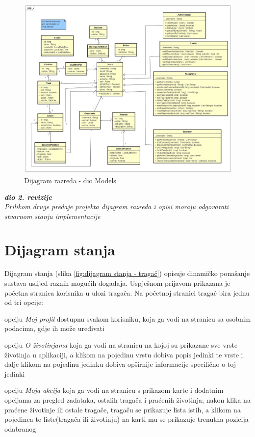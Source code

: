 			\eject

			\begin{figure}[H]
				\includegraphics[scale=0.4]{slike/klasni_dijagram_models.jpg}
				\centering
				\caption{Dijagram razreda - dio Models}
				\label{fig:models}
			\end{figure}
			

			\textbf{\textit{dio 2. revizije}}\\			
			
			\textit{Prilikom druge predaje projekta dijagram razreda i opisi moraju odgovarati stvarnom stanju implementacije}
			
			
			
			\eject
		
		\section{Dijagram stanja}
			
			Dijagram stanja (slika \ref{fig:dijagram stanja - tragač}) opisuje dinamičko ponašanje sustava uslijed raznih mogućih
		događaja. Uspješnom prijavom prikazana je početna stranica korisnika u ulozi tragača. 
		Na početnoj stranici tragač bira jednu od tri opcije:
		\begin{packed_item}
		\item opciju \textit{Moj profil} dostupnu svakom korisniku, koja ga vodi na stranicu sa osobnim podacima, gdje ih može uređivati
		\item opciju \textit{O životinjama} koja ga vodi na stranicu na kojoj su prikazane sve vrste životinja u aplikaciji, a klikom na pojedinu vrstu dobiva popis jedinki te vrste i dalje klikom na pojedinu jedinku dobiva opširnije informacije specifično o toj jedinki
		\item opciju \textit{Moja akcija} koja ga vodi na stranicu s prikazom karte i dodatnim opcijama za pregled zadataka, ostalih tragača i praćenih životinja; nakon klika na praćene životinje ili ostale tragače, tragaču se prikazuje lista istih, a klikom na pojedinca te liste(tragača ili životinju) na karti mu se prikazuje trenutna pozicija odabranog
		\end{packed_item}

